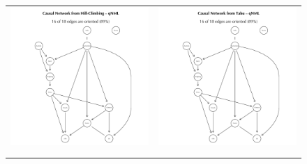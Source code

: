 \documentclass[twoside,twocolumn]{article}
\begin{document}
\begin{figure}[H]
{\begin{tabular}{cc}
 \includegraphics[trim={ 1.5cm  0 1.5cm 0 },clip, width=75mm]{../1. Code/Implied Volatility/Exports/Networks/Causal/Causal3}& \includegraphics[trim={ 1.5cm  0 1.5cm 0 },clip, width=75mm]{../1. Code/Implied Volatility/Exports/Networks/Causal/Causal4} \\  
 \\
 \\

\end{tabular}}
\end{figure}
\end{document}
